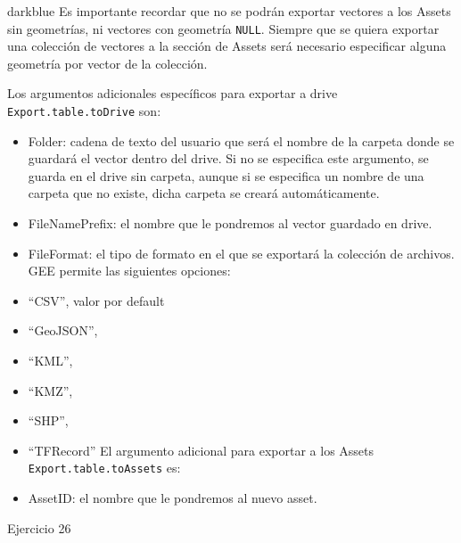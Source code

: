 \documentclass[
  12pt,
  letterpaper,
  twoside]{book}
\begin{document}
\begin{bluebox2}

\begin{awesomeblock}{5pt}{\faLightbulb}{darkblue}
Es importante recordar que no se podrán exportar vectores a los Assets sin geometrías, ni vectores con geometría \texttt{NULL}. Siempre que se quiera exportar una colección de vectores a la sección de Assets será necesario especificar alguna geometría por vector de la colección.

\end{awesomeblock}

\end{bluebox2}

Los argumentos adicionales específicos para exportar a drive \texttt{Export.table.toDrive} son:

\begin{itemize}
\item
  Folder: cadena de texto del usuario que será el nombre de la carpeta donde se guardará el vector dentro del drive. Si no se especifica este argumento, se guarda en el drive sin carpeta, aunque si se especifica un nombre de una carpeta que no existe, dicha carpeta se creará automáticamente.
\item
  FileNamePrefix: el nombre que le pondremos al vector guardado en drive.
\item
  FileFormat: el tipo de formato en el que se exportará la colección de archivos. GEE permite las siguientes opciones:
\item
  ``CSV'', valor por default
\item
  ``GeoJSON'',
\item
  ``KML'',
\item
  ``KMZ'',
\item
  ``SHP'',
\item
  ``TFRecord''
  El argumento adicional para exportar a los Assets \texttt{Export.table.toAssets} es:
\item
  AssetID: el nombre que le pondremos al nuevo asset.
\end{itemize}

Ejercicio 26
\end{document}
